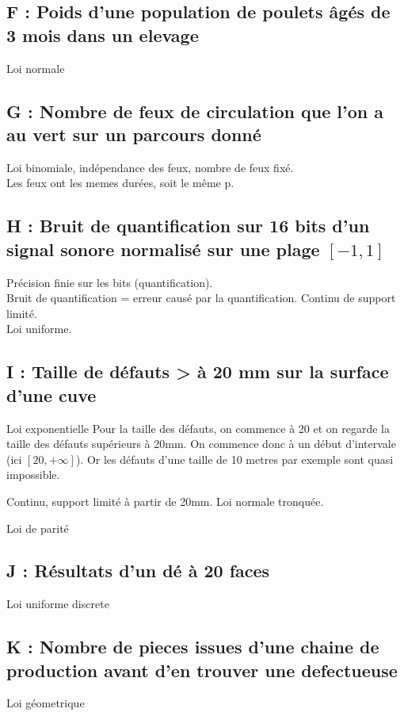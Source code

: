 \documentclass[11pt]{article}
\begin{document}
\subsection{F : Poids d'une population de poulets âgés de 3 mois dans un elevage}
Loi normale

\subsection{G : Nombre de feux de circulation que l'on a au vert sur un parcours donné}
Loi binomiale, indépendance des feux, nombre de feux fixé.\\
Les feux ont les memes durées, soit le même p.

\subsection{H : Bruit de quantification sur 16 bits d'un signal sonore normalisé sur une plage $[-1,1]$}
Précision finie sur les bits (quantification).\\
Bruit de quantification = erreur causé par la quantification.
Continu de support limité.\\
Loi uniforme.

\subsection{I : Taille de défauts > à 20 mm sur la surface d'une cuve}
Loi exponentielle
Pour la taille des défauts, on commence à 20 et on regarde la taille des défauts supérieurs à 20mm.
On commence donc à un début d'intervale (ici $[20,+\infty]$). Or les défauts d'une taille de 10 metres par exemple sont quasi impossible.

Continu, support limité à partir de 20mm.
Loi normale tronquée.

Loi de parité

\subsection{J : Résultats d'un dé à 20 faces}
Loi uniforme discrete

\subsection{K : Nombre de pieces issues d'une chaine de production avant d'en trouver une defectueuse}
Loi géometrique

\pagebreak
\end{document}

